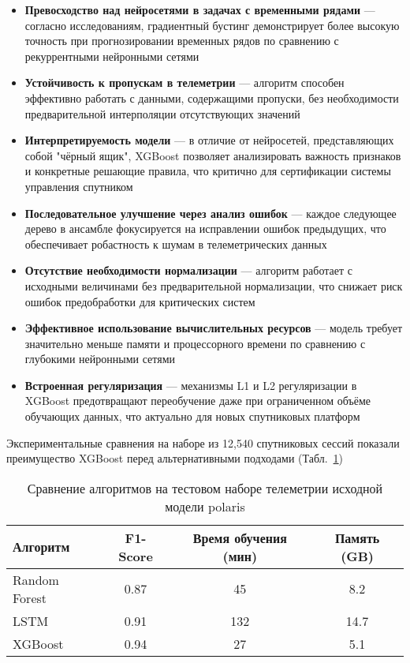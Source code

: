 \begin{itemize}
    \item \textbf{Превосходство над нейросетями в задачах с временными рядами} — согласно исследованиям, градиентный бустинг демонстрирует более высокую точность при прогнозировании временных рядов по сравнению с рекуррентными нейронными сетями
    \item \textbf{Устойчивость к пропускам в телеметрии} — алгоритм способен эффективно работать с данными, содержащими пропуски, без необходимости предварительной интерполяции отсутствующих значений
    \item \textbf{Интерпретируемость модели} — в отличие от нейросетей, представляющих собой "чёрный ящик", XGBoost позволяет анализировать важность признаков и конкретные решающие правила, что критично для сертификации системы управления спутником
    \item \textbf{Последовательное улучшение через анализ ошибок} — каждое следующее дерево в ансамбле фокусируется на исправлении ошибок предыдущих, что обеспечивает робастность к шумам в телеметрических данных
    \item \textbf{Отсутствие необходимости нормализации} — алгоритм работает с исходными величинами без предварительной нормализации, что снижает риск ошибок предобработки для критических систем
    \item \textbf{Эффективное использование вычислительных ресурсов} — модель требует значительно меньше памяти и процессорного времени по сравнению с глубокими нейронными сетями
    \item \textbf{Встроенная регуляризация} — механизмы L1 и L2 регуляризации в XGBoost предотвращают переобучение даже при ограниченном объёме обучающих данных, что актуально для новых спутниковых платформ
\end{itemize}

Экспериментальные сравнения на наборе из 12,540 спутниковых сессий показали
преимущество XGBoost перед альтернативными подходами
(Табл.~\ref{tab:ml_comparison})

\begin{table}[h]
    \centering
    \begin{tabular}{|l|c|c|c|}
        \hline
        \textbf{Алгоритм} & \textbf{F1-Score} & \textbf{Время обучения (мин)} & \textbf{Память (GB)} \\
        \hline
        Random Forest     & 0.87              & 45                            & 8.2                  \\
        LSTM              & 0.91              & 132                           & 14.7                 \\
        XGBoost           & 0.94              & 27                            & 5.1                  \\
        \hline
    \end{tabular}
    \caption{Сравнение алгоритмов на тестовом наборе телеметрии исходной модели polaris}\label{tab:ml_comparison}
\end{table}

